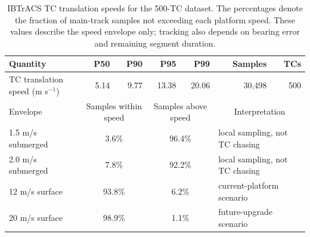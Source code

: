 \begin{table}[t]
\centering
\caption{IBTrACS TC translation speeds for the 500-TC dataset.
The percentages denote the fraction of main-track samples not exceeding
each platform speed. These values describe the speed envelope only;
tracking also depends on bearing error and remaining segment duration.}
\label{tab:tc_speed_envelope}
\small
\begin{tabular*}{\textwidth}{@{\extracolsep{\fill}}lrrrrrr@{}}
\toprule
Quantity & P50 & P90 & P95 & P99 & Samples & TCs \\
\midrule
TC translation speed (m s$^{-1}$) & 5.14 & 9.77 & 13.38 & 20.06 & 30,498 & 500 \\
\midrule
Envelope & \multicolumn{2}{c}{Samples within speed} & \multicolumn{2}{c}{Samples above speed} & \multicolumn{2}{c}{Interpretation} \\
1.5 m/s submerged & \multicolumn{2}{c}{3.6\%} & \multicolumn{2}{c}{96.4\%} & \multicolumn{2}{l}{local sampling, not TC chasing} \\
2.0 m/s submerged & \multicolumn{2}{c}{7.8\%} & \multicolumn{2}{c}{92.2\%} & \multicolumn{2}{l}{local sampling, not TC chasing} \\
12 m/s surface & \multicolumn{2}{c}{93.8\%} & \multicolumn{2}{c}{6.2\%} & \multicolumn{2}{l}{current-platform scenario} \\
20 m/s surface & \multicolumn{2}{c}{98.9\%} & \multicolumn{2}{c}{1.1\%} & \multicolumn{2}{l}{future-upgrade scenario} \\
\bottomrule
\end{tabular*}
\end{table}

